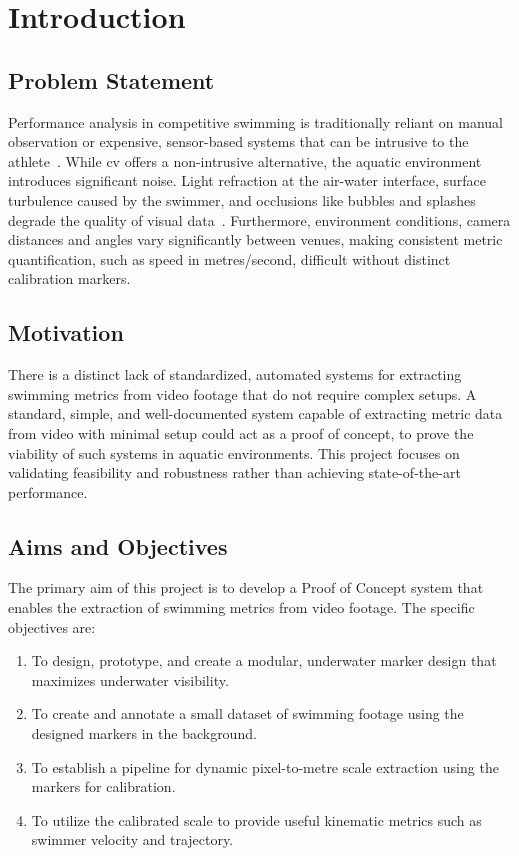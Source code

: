 \chapter{Introduction}%
\label{chp:introduction}

\section{Problem Statement}
Performance analysis in competitive swimming is traditionally reliant on manual observation or expensive, sensor-based systems that can be intrusive to the athlete~\cite{hsieh_comprehensive_2024}.
While \gls{cv} offers a non-intrusive alternative, the aquatic environment introduces significant noise.
Light refraction at the air-water interface, surface turbulence caused by the swimmer, and occlusions like bubbles and splashes degrade the quality of visual data~\cite{ahmed2019, giulietti_swimmernet_2023}.
Furthermore, environment conditions, camera distances and angles vary significantly between venues, making consistent metric quantification, such as speed in metres/second, difficult without distinct calibration markers.

\section{Motivation}
There is a distinct lack of standardized, automated systems for extracting swimming metrics from video footage that do not require complex setups.
A standard, simple, and well-documented system capable of extracting metric data from video with minimal setup could act as a proof of concept, to prove the viability of such systems in aquatic environments. This project focuses on validating feasibility and robustness rather than achieving state-of-the-art performance.

\section{Aims and Objectives}
The primary aim of this project is to develop a Proof of Concept system that enables the extraction of swimming metrics from video footage. The specific objectives are:
\begin{enumerate}
    \item To design, prototype, and create a modular, underwater marker design that maximizes underwater visibility.\label{obj:marker_design}
    \item To create and annotate a small dataset of swimming footage using the designed markers in the background.\label{obj:dataset_creation}
    \item To establish a pipeline for dynamic pixel-to-metre scale extraction using the markers for calibration.\label{obj:calibration}
    \item To utilize the calibrated scale to provide useful kinematic metrics such as swimmer velocity and trajectory.\label{obj:kinematic_metrics}
\end{enumerate}

